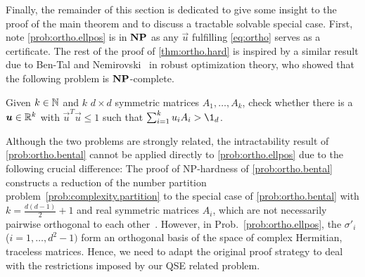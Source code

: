 Finally, the remainder of this section is dedicated to give some insight to the proof of the main theorem and to discuss a tractable solvable special case.
First, note \cref{prob:ortho.ellpos} is in $\mathbf{NP}$ as any $\vec u$ fulfilling \cref{eq:ortho} serves as a certificate.
The rest of the proof of \cref{thm:ortho.hard} is inspired by a similar result due to Ben-Tal and Nemirovski~\cite{Tal_1998_Robust} in robust optimization theory, who showed that the following problem is $\mathbf{NP}$-complete.
\begin{problem}
  \label{prob:ortho.bental}
  Given $k \in \mathbb{N}$ and $k$ $d\times d$ symmetric matrices $A_{1},\ldots,A_{k}$, check whether there is a ${\boldsymbol{u}} \in \mathbb{R}^k$ with $\vec{u}^{T}\vec{u} \leq 1$ such that $\sum_{i=1}^{k}u_{i}A_{i} > \1_{d}$.
\end{problem}
Although the two problems are strongly related, the intractability result of \cref{prob:ortho.bental} cannot be applied directly to \cref{prob:ortho.ellpos} due to the following crucial difference:
The proof of NP-hardness of \cref{prob:ortho.bental} constructs a reduction of the number partition problem~\ref{prob:complexity.partition} to the special case of \cref{prob:ortho.bental} with $k=\frac{d(d-1)}{2} + 1$ and real symmetric matrices $A_i$, which are not necessarily pairwise orthogonal to each other~\cite[Sec.~3.4.1]{Tal_1998_Robust}.
However, in Prob.~\ref{prob:ortho.ellpos}, the $\sigma'_i$ ($i=1,\ldots,d^2 - 1)$ form an orthogonal basis of the space of complex Hermitian, traceless matrices.
Hence, we need to adapt the original proof strategy to deal with the restrictions imposed by our QSE related problem.

